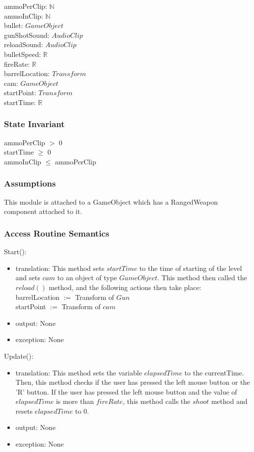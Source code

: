 \documentclass[12pt]{article}
\begin{document}
ammoPerClip: $\mathbb{N}$\\
ammoInClip: $\mathbb{N}$\\
bullet: $GameObject$\\
gunShotSound: $AudioClip$\\
reloadSound: $AudioClip$\\
bulletSpeed: $\mathbb{R}$\\
fireRate: $\mathbb{R}$\\
barrelLocation: $Transform$\\
cam: $GameObject$\\
startPoint: $Transform$\\
startTime: $\mathbb{R}$\\
\subsubsection* {State Invariant}

ammoPerClip $>$ 0\\
startTime $\geq$ 0\\
ammoInClip $\leq$ ammoPerClip\\

\subsubsection* {Assumptions}

This module is attached to a GameObject which has a RangedWeapon component attached to it.

\subsubsection* {Access Routine Semantics}

\noindent Start():
\begin{itemize}
	\item translation: This method sets $startTime$ to the time of starting of the level and sets $cam$ to an object of type $GameObject$. This method then called the $reload()$ method, and the following actions then take place:\\
	barrelLocation $:=$ Transform of $Gun$\\
	startPoint $:=$ Transform of $cam$ 
	\item output: None
	\item exception: None
\end{itemize}

\noindent Update():
\begin{itemize}
	\item translation: This method sets the variable $elapsedTime$ to the currentTime.
	Then, this method checks if the user has pressed the left mouse button or the 'R' button. If the user has pressed the left mouse button and the value of $elapsedTime$ is more than $fireRate$, this method calls the $shoot$ method and resets $elapsedTime$ to 0.
	\item output: None
	\item exception: None
\end{itemize}
\end{document}
